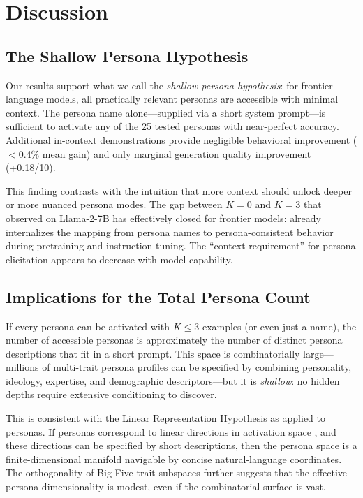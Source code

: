 \section{Discussion}
\label{sec:discussion}

\subsection{The Shallow Persona Hypothesis}
\label{sec:shallow}

Our results support what we call the \emph{shallow persona hypothesis}: for frontier language models, all practically relevant personas are accessible with minimal context. The persona name alone---supplied via a short system prompt---is sufficient to activate any of the 25 tested personas with near-perfect accuracy. Additional in-context demonstrations provide negligible behavioral improvement ($<$0.4\% mean gain) and only marginal generation quality improvement (+0.18/10).

This finding contrasts with the intuition that more context should unlock deeper or more nuanced persona modes. The gap between $K{=}0$ and $K{=}3$ that \citet{choi2024picle} observed on Llama-2-7B has effectively closed for frontier models: \gptmini already internalizes the mapping from persona names to persona-consistent behavior during pretraining and instruction tuning. The ``context requirement'' for persona elicitation appears to decrease with model capability.

\subsection{Implications for the Total Persona Count}
\label{sec:implications}

If every persona can be activated with $K \leq 3$ examples (or even just a name), the number of accessible personas is approximately the number of distinct persona descriptions that fit in a short prompt. This space is combinatorially large---millions of multi-trait persona profiles can be specified by combining personality, ideology, expertise, and demographic descriptors---but it is \emph{shallow}: no hidden depths require extensive conditioning to discover.

This is consistent with the Linear Representation Hypothesis as applied to personas. If personas correspond to linear directions in activation space \citep{chen2025personavectors, wang2025geometry}, and these directions can be specified by short descriptions, then the persona space is a finite-dimensional manifold navigable by concise natural-language coordinates. The orthogonality of Big Five trait subspaces \citep{wang2025geometry} further suggests that the effective persona dimensionality is modest, even if the combinatorial surface is vast.

